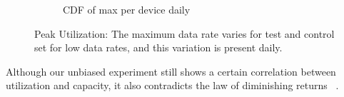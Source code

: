 \begin{figure}[ht!]
\begin{minipage}{0.90\linewidth}
\begin{subfigure}[b]{0.90\linewidth}
  \caption{CDF of max per device daily}
  \vspace{1em}
  \label{fig:CDF-data-rate-max-daily}
\end{subfigure}
\end{minipage}
\caption{Peak Utilization: The maximum data rate varies for test and control set for low data rates, and this variation is present daily.}
\label{fig:peak-utilization}
\end{figure}

Although our unbiased experiment still
shows a certain correlation between utilization and capacity, it also contradicts the
law of diminishing returns ~\cite{dasu-imc2014}. 